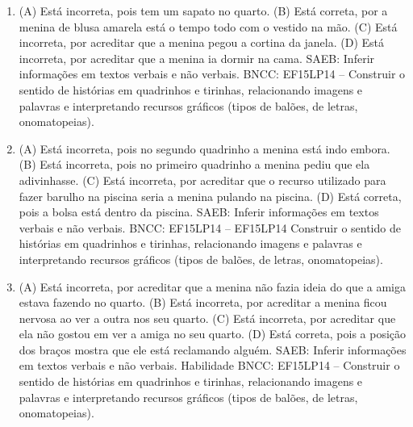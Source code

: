 
\begin{enumerate}
\item
(A) Está incorreta, pois tem um sapato no quarto.
(B) Está correta, por a menina de blusa amarela está o tempo todo com o
vestido na mão.
(C) Está incorreta, por acreditar que a menina pegou a cortina da janela.
(D) Está incorreta, por acreditar que a menina ia dormir na cama.
SAEB: Inferir informações em textos verbais e não verbais.
BNCC: EF15LP14 -- Construir o sentido de histórias em
quadrinhos e tirinhas, relacionando imagens e palavras e interpretando
recursos gráficos (tipos de balões, de letras, onomatopeias).

\item
(A) Está incorreta, pois no segundo quadrinho a menina está indo embora.
(B) Está incorreta, pois no primeiro quadrinho a menina pediu que ela
adivinhasse.
(C) Está incorreta, por acreditar que o recurso utilizado para fazer
barulho na piscina seria a menina pulando na piscina.
(D) Está correta, pois a bolsa está dentro da
piscina.
SAEB: Inferir informações em textos verbais e não verbais.
BNCC: EF15LP14 -- EF15LP14 Construir o sentido de histórias em
quadrinhos e tirinhas, relacionando imagens e palavras e interpretando
recursos gráficos (tipos de balões, de letras, onomatopeias).

\item
(A) Está incorreta, por acreditar que a menina não fazia ideia do que a
amiga estava fazendo no quarto.
(B) Está incorreta, por acreditar a menina ficou nervosa ao ver a outra
nos seu quarto.
(C) Está incorreta, por acreditar que ela não gostou em ver a amiga no
seu quarto.
(D) Está correta, pois a posição dos braços mostra que ele está
reclamando alguém.
SAEB: Inferir informações em textos verbais e não verbais.
Habilidade BNCC: EF15LP14 -- Construir o sentido de histórias em
quadrinhos e tirinhas, relacionando imagens e palavras e interpretando
recursos gráficos (tipos de balões, de letras, onomatopeias).
\end{enumerate}



